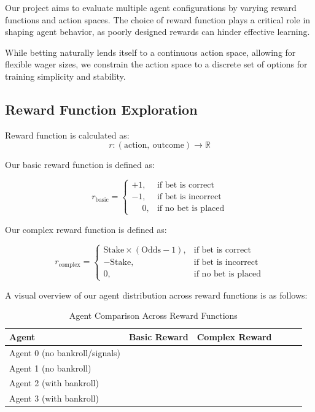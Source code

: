 \documentclass[sigconf]{acmart}
\newcommand{\cmark}{\ding{51}}  %
\begin{document}
Our project aims to evaluate multiple agent configurations by varying reward functions and action spaces. The choice of reward function plays a critical role in shaping agent behavior, as poorly designed rewards can hinder effective learning.

While betting naturally lends itself to a continuous action space, allowing for flexible wager sizes, we constrain the action space to a discrete set of options for training simplicity and stability.

\subsection{Reward Function Exploration}

Reward function is calculated as:
\[
r: (\text{action},\ \text{outcome}) \rightarrow \mathbb{R}
\]

Our basic reward function is defined as:

\begin{equation}
r_{\text{basic}} =
\begin{cases}
+1, & \text{if bet is correct} \\
-1, & \text{if bet is incorrect} \\
\phantom{+}0, & \text{if no bet is placed}
\end{cases}
\end{equation}

Our complex reward function is defined as:

\begin{equation}
r_{\text{complex}} =
\begin{cases}
\text{Stake} \times (\text{Odds} - 1), & \text{if bet is correct} \\
-\text{Stake}, & \text{if bet is incorrect} \\
\text{0}, & \text{if no bet is placed}
\end{cases}
\end{equation}

A visual overview of our agent distribution across reward functions is as follows:

\begin{table}[h]
  \caption{Agent Comparison Across Reward Functions}
  \label{tab:agent_benchmarks}
  \begin{tabular}{lccccc}
    \toprule
    \textbf{Agent} & \textbf{Basic Reward} & \textbf{Complex Reward} \\
    \midrule
    Agent 0 (no bankroll/signals)     & \cmark  &        \\
    Agent 1 (no bankroll)     & \cmark  &        \\
    Agent 2 (with bankroll)   &         & \cmark \\
    Agent 3 (with bankroll)   &         & \cmark \\
    \bottomrule
  \end{tabular}
\end{table}
\end{document}
